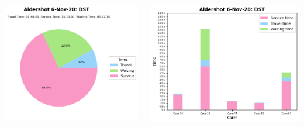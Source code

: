 \documentclass[usenames,dvipsnames]{beamer}
\begin{document}
\begin{frame}
\begin{columns}
\begin{minipage}[c][0.45\textheight][c]{\linewidth}
		\end{minipage}
		\begin{minipage}[c][0.45\textheight][c]{\linewidth}
			\centering
			\includegraphics[width=1\linewidth]{figures/6_Nov_20_Aldershot_time_info_dst}
		\end{minipage}
		\begin{minipage}[c][0.45\textheight][c]{\linewidth}
			\vspace{5mm}
			\centering
			\includegraphics[width=1\linewidth]{figures/6_Nov_20_Aldershot_workload_dst}
		\end{minipage}
	\end{columns}
\end{frame}
\end{document}
